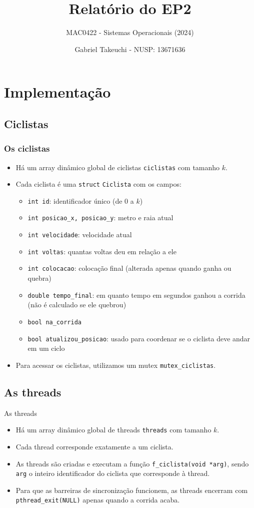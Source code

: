 \documentclass{beamer}
\title{Relatório do EP2}
\subtitle{MAC0422 - Sistemas Operacionais (2024)}
\author{Gabriel Takeuchi - NUSP: 13671636}
\date{}
\begin{document}
\begin{frame}
  \titlepage
\end{frame}

\section{Implementação}

\subsection{Ciclistas}
\begin{frame}
  \frametitle{Os ciclistas}
  \begin{itemize}
    \item Há um array dinâmico global de ciclistas \texttt{ciclistas} com tamanho $k$.
    \item Cada ciclista é uma \texttt{struct} \texttt{Ciclista} com os campos:
    \begin{itemize}
      \item \texttt{int id}: identificador único (de 0 a $k$)
      \item \texttt{int posicao\_x, posicao\_y}: metro e raia atual
      \item \texttt{int velocidade}: velocidade atual
      \item \texttt{int voltas}: quantas voltas deu em relação a ele
      \item \texttt{int colocacao}: colocação final (alterada apenas quando ganha ou quebra)
      \item \texttt{double tempo\_final}: em quanto tempo em segundos ganhou a corrida (não é calculado se ele quebrou)
      \item \texttt{bool na\_corrida}
      \item \texttt{bool atualizou\_posicao}: usado para coordenar se o ciclista deve andar em um ciclo
    \end{itemize}
  \item Para acessar os ciclistas, utilizamos um mutex \texttt{mutex\_ciclistas}.
  \end{itemize}
\end{frame}

\subsection{As threads}
\begin{frame}{As threads}
  \begin{itemize}
    \item Há um array dinâmico global de threads \texttt{threads} com tamanho $k$.
    \item Cada thread corresponde exatamente a um ciclista.
    \item As threads são criadas e executam a função \texttt{f\_ciclista(void *arg)}, sendo \texttt{arg} o inteiro identificador do ciclista que corresponde à thread.
    \item Para que as barreiras de sincronização funcionem, as threads encerram com \texttt{pthread\_exit(NULL)} apenas quando a corrida acaba.
  \end{itemize}
\end{frame}
\end{document}
